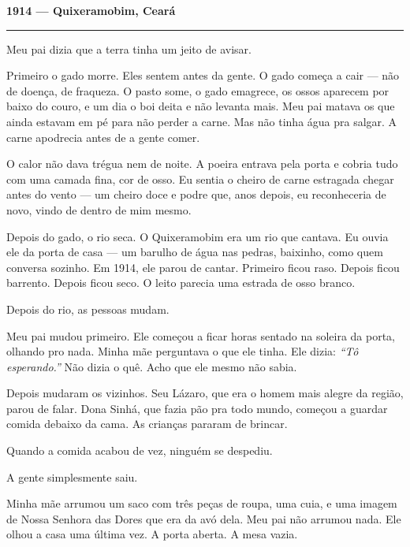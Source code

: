
\noindent \textbf{1914 --- Quixeramobim, Ceará}

\vspace{0.5em}\noindent\rule{\textwidth}{0.5pt}\vspace{0.5em}

\noindent Meu pai dizia que a terra tinha um jeito de avisar.

\noindent Primeiro o gado morre. Eles sentem antes da gente. O gado começa a cair --- não de doença, de fraqueza. O pasto some, o gado emagrece, os ossos aparecem por baixo do couro, e um dia o boi deita e não levanta mais. Meu pai matava os que ainda estavam em pé para não perder a carne. Mas não tinha água pra salgar. A carne apodrecia antes de a gente comer.

\noindent O calor não dava trégua nem de noite. A poeira entrava pela porta e cobria tudo com uma camada fina, cor de osso. Eu sentia o cheiro de carne estragada chegar antes do vento --- um cheiro doce e podre que, anos depois, eu reconheceria de novo, vindo de dentro de mim mesmo.

\noindent Depois do gado, o rio seca. O Quixeramobim era um rio que cantava. Eu ouvia ele da porta de casa --- um barulho de água nas pedras, baixinho, como quem conversa sozinho. Em 1914, ele parou de cantar. Primeiro ficou raso. Depois ficou barrento. Depois ficou seco. O leito parecia uma estrada de osso branco.

\noindent Depois do rio, as pessoas mudam.

\noindent Meu pai mudou primeiro. Ele começou a ficar horas sentado na soleira da porta, olhando pro nada. Minha mãe perguntava o que ele tinha. Ele dizia: \textit{\textquotedblleft{}Tô esperando.\textquotedblright{}} Não dizia o quê. Acho que ele mesmo não sabia.

\noindent Depois mudaram os vizinhos. Seu Lázaro, que era o homem mais alegre da região, parou de falar. Dona Sinhá, que fazia pão pra todo mundo, começou a guardar comida debaixo da cama. As crianças pararam de brincar.

\noindent Quando a comida acabou de vez, ninguém se despediu.

\noindent A gente simplesmente saiu.

\noindent Minha mãe arrumou um saco com três peças de roupa, uma cuia, e uma imagem de Nossa Senhora das Dores que era da avó dela. Meu pai não arrumou nada. Ele olhou a casa uma última vez. A porta aberta. A mesa vazia.

